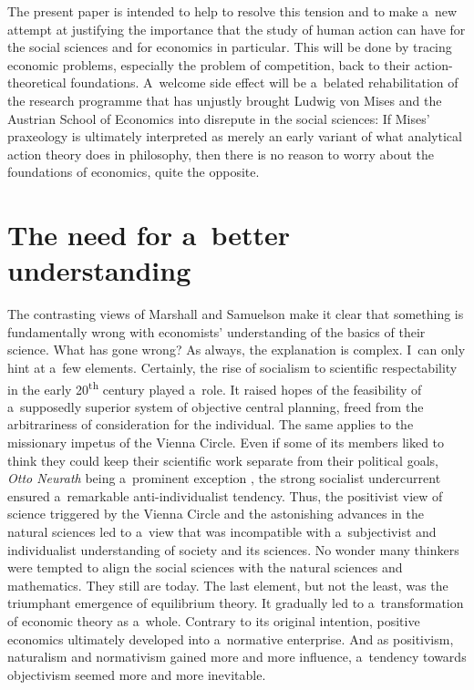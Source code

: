 The present paper is intended to help to resolve this tension and to make a~new attempt at justifying the importance that the study of human action can have for the social sciences and for economics in particular. This will be done by tracing economic problems, especially the problem of competition, back to their action-theoretical foundations. A~welcome side effect will be a~belated rehabilitation of the research programme that has unjustly brought Ludwig von Mises and the Austrian School of Economics into disrepute in the social sciences: If Mises' praxeology is ultimately interpreted as merely an early variant of what analytical action theory does in philosophy, then there is no reason to worry about the foundations of economics, quite the opposite.



\section{The need for a~better understanding}

The contrasting views of Marshall and Samuelson make it clear that something is fundamentally wrong with economists' understanding of the basics of their science. What has gone wrong? As always, the explanation is complex. I~can only hint at a~few elements. Certainly, the rise of socialism to scientific respectability in the early 20\textsuperscript{th} century played a~role. It raised hopes of the feasibility of a~supposedly superior system of objective central planning, freed from the arbitrariness of consideration for the individual. The same applies to the missionary impetus of the Vienna Circle. Even if some of its members liked to think they could keep their scientific work separate from their political goals, \textit{Otto Neurath} being a~prominent exception 
\parencites[cf.][p.23]{richardson_left_2009}[][p.23]{schilpp_intellectual_1963}, %
 the strong socialist undercurrent ensured a~remarkable anti-individualist tendency. Thus, the positivist view of science triggered by the Vienna Circle and the astonishing advances in the natural sciences led to a~view that was incompatible with a~subjectivist and individualist understanding of society and its sciences. No wonder many thinkers were tempted to align the social sciences with the natural sciences and mathematics. They still are today. The last element, but not the least, was the triumphant emergence of equilibrium theory. It gradually led to a~transformation of economic theory as a~whole. Contrary to its original intention, positive economics ultimately developed into a~normative enterprise. And as positivism, naturalism and normativism gained more and more influence, a~tendency towards objectivism seemed more and more inevitable.



